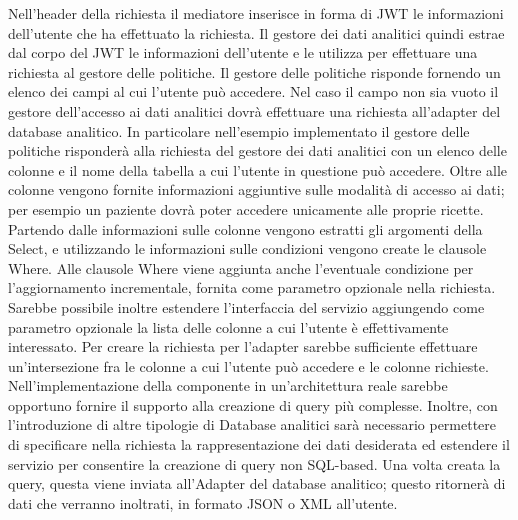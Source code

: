 \documentclass[12pt]{report}
\begin{document}
Nell'header della richiesta il mediatore inserisce in forma di JWT le informazioni dell'utente che ha effettuato la richiesta.
Il gestore dei dati analitici quindi estrae dal corpo del JWT le informazioni dell'utente e le utilizza per effettuare una richiesta al gestore delle politiche.
Il gestore delle politiche risponde fornendo un elenco dei campi al cui l'utente può accedere.
Nel caso il campo non sia vuoto il gestore dell'accesso ai dati analitici dovrà effettuare una richiesta all'adapter del database analitico.
In particolare nell'esempio implementato il gestore delle politiche risponderà alla richiesta del gestore dei dati analitici con un elenco delle colonne e il nome della tabella a cui l'utente in questione può accedere.
Oltre alle colonne vengono fornite informazioni aggiuntive sulle modalità di accesso ai dati; per esempio un paziente dovrà poter accedere unicamente alle proprie ricette.
Partendo dalle informazioni sulle colonne vengono estratti gli argomenti della Select, e utilizzando le informazioni sulle condizioni vengono create le clausole Where.
Alle clausole Where viene aggiunta anche l'eventuale condizione per l'aggiornamento incrementale, fornita come parametro opzionale nella richiesta.
Sarebbe possibile inoltre estendere l'interfaccia del servizio aggiungendo come parametro opzionale la lista delle colonne a cui l'utente è effettivamente interessato.
Per creare la richiesta per l'adapter sarebbe sufficiente effettuare un'intersezione fra le colonne a cui l'utente può accedere e le colonne richieste.
Nell'implementazione della componente in un'architettura reale sarebbe opportuno fornire il supporto alla creazione di query più complesse.
Inoltre, con l'introduzione di altre tipologie di Database analitici sarà necessario permettere di specificare nella richiesta la rappresentazione dei dati desiderata ed estendere il servizio per consentire la creazione di query non SQL-based. 
Una volta creata la query, questa viene inviata all'Adapter del database analitico; questo ritornerà di dati che verranno inoltrati, in formato JSON o XML all'utente.
\end{document}
